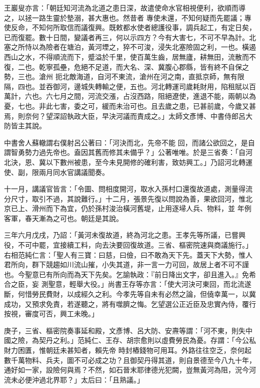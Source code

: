 \begin{pinyinscope}
 王巖叟亦言：「朝廷知河流為北道之患日深，故遣使命水官相視便利，欲順而導之，以拯一路生靈於墊溺，甚大惠也。然昔者
 專使未還，不知何疑而先罷議；專使反命，不知何所取信而議復興。既敕都水使者總護役事，調兵起工，有定日矣，已而復罷。數十日間，變議者再三，何以示四方？今有大害七，不可不早為計。北塞之所恃以為險者在塘泊，黃河堙之，猝不可浚，浸失北塞險固之利，一也。橫遏西山之水，不得順流而下，蹙溢於千里，使百萬生齒，居無廬，耕無田，流散而不復，二也。乾寧孤壘，危絕不足道，而大名、深、冀腹心郡縣，皆有終不自保之勢，三也。滄州
 扼北敵海道，自河不東流，滄州在河之南，直抵京師，無有限隔，四也。並吞御河，邊城失轉輸之便，五也。河北轉運司歲耗財用，陷租賦以百萬計，六也。六七月之間，河流交漲，占沒西路，阻絕遼使，進退不能，兩朝以為憂，七也。非此七害，委之可，緩而未治可也。且去歲之患，已甚前歲，今歲又甚焉，則奈何？望深詔執政大臣，早決河議而責成之。」太師文彥博、中書侍郎呂大防皆主其說。



 中書舍人蘇轍謂右僕射呂公著曰：「河決而北，先帝不能
 回，而諸公欲回之，是自謂智勇勢力過先帝也。盍因其舊而修其未備乎？」公著唯唯。於是三省奏：「自河北決，恩、冀以下數州被患，至今未見開修的確利害，致妨興工。」乃詔河北轉運使、副，限兩月同水官講議聞奏。



 十一月，講議官皆言：「令圖、問相度開河，取水入孫村口還復故道處，測量得流分尺寸，取引不過，其說難行。」十二月，張景先復以問說為善，果欲回河，惟北京已上、滑州而下為宜，仍於孫村浚治橫河舊堤，止用逐埽人兵、物料，並
 年例客軍，春天漸為之可也。朝廷是其說。



 三年六月戊戌，乃詔：「黃河未復故道，終為河北之患。王孝先等所議，已嘗興役，不可中罷，宜接續工料，向去決要回復故道。三省、樞密院速與商議施行。」右相范純仁言：「聖人有三寶：曰慈，曰儉，曰不敢為天下先。蓋天下大勢，惟人君所向，群下競趨如川流山摧，小失其道，非一言一力可回，故居上者不可不謹也。今聖意已有所向而為天下先矣。乞諭執政：『前日降出文字，卻且進入。』免希合之臣，妄
 測聖意，輕舉大役。」尚書王存等亦言：「使大河決可東回，而北流遂斷，何惜勞民費財，以成經久之利。今孝先等自未有必然之論，但僥幸萬一，以冀成功，又預求免責，若遂聽之，將有噬臍之悔。乞望選公正近臣及忠實內侍，覆行按視，審度可否，興工未晚。」



 庚子，三省、樞密院奏事延和殿，文彥博、呂大防、安燾等謂：「河不東，則失中國之險，為契丹之利。」范純仁、王存、胡宗愈則以虛費勞民為憂。存謂：「今公私財力困匱，惟朝廷未甚知者，賴先帝
 時封樁錢物可用耳。外路往往空乏，奈何起數千萬物料、兵夫，圖不可必成之功？且御契丹得其道，則自景德至今八九十年，通好如一家，設險何與焉？不然，如石晉末耶律德光犯闕，豈無黃河為阻，況今河流未必便沖過北界耶？」太后曰：「且熟議。」




\end{pinyinscope}
